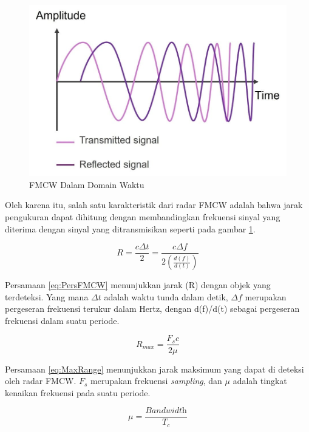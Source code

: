 \begin{figure}
	\begin{center}
		\includegraphics[scale=0.4]{pics/bab2/txRxWave.jpg}
		\caption[FMCW Dalam Domain Waktu]{FMCW Dalam Domain Waktu}
		\label{pic:FMCWTime}
	\end{center}
\end{figure}

Oleh karena itu, salah satu karakteristik dari radar FMCW adalah bahwa jarak pengukuran dapat dihitung dengan membandingkan frekuensi sinyal yang diterima dengan sinyal yang ditransmisikan seperti pada gambar \ref{pic:FMCWTime}.   

\begin{equation} 
	R = \frac{c \Delta{t}}{2} = \frac{c \Delta{f}}{2(\frac{d(f)}{d(t)})}
	\label{eq:PersFMCW}
\end{equation}

Persamaan \ref{eq:PersFMCW} menunjukkan jarak (R) dengan objek yang terdeteksi. Yang mana $\Delta{t}$ adalah waktu tunda dalam detik, $\Delta{f}$ merupakan pergeseran frekuensi terukur dalam Hertz, dengan d(f)/d(t) sebagai pergeseran frekuensi dalam suatu periode. 

\begin{equation}
	R_{max} = \frac{F_{s} c}{2 \mu}
	\label{eq:MaxRange}
\end{equation}

Persamaan \ref{eq:MaxRange} menunjukkan jarak maksimum yang dapat di deteksi oleh radar FMCW. $F_{s}$ merupakan frekuensi \textit{sampling}, dan $\mu$ adalah tingkat kenaikan frekuensi pada suatu periode.

\begin{equation}
	\mu = \frac{\textit{Bandwidth}}{T_{c}}
	\label{eq:chirpRate}
\end{equation}

